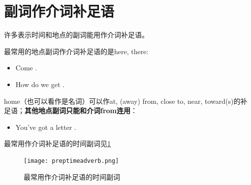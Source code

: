 \section{副词作介词补足语}
\label{sec:adverbprep}

许多表示时间和地点的副词能用作介词补足语。

最常用的地点副词作介词补足语的是here, there:
\begin{itemize}
\item Come .
\item How do we get .
\end{itemize}

home（也可以看作是名词）可以作at, (away) from, close to, near, toward(s)的补
足语；\textbf{其他地点副词只能和介词from连用}：
\begin{itemize}
\item You've got a letter .
\end{itemize}

最常用作介词补足语的时间副词见\cref{fig:preptimeadv}
\begin{figure}[ht]
  \centering
  \texttt{[image: preptimeadverb.png]}
  \caption{\label{fig:preptimeadv}最常用作介词补足语的时间副词}
\end{figure}






